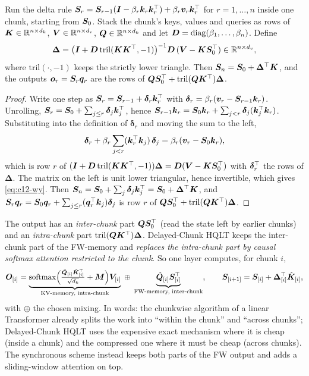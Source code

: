 \begin{proposition}\label{prop:c12-chunk-delta}
Run the delta rule $\bm{S}_r = \bm{S}_{r-1}(\bm{I}-\beta_r\bm{k}_r\bm{k}_r^{\top}) + \beta_r\bm{v}_r\bm{k}_r^{\top}$ for $r =
1,\dots,n$ inside one chunk, starting from $\bm{S}_0$. Stack the chunk's keys, values and queries as
rows of $\bm{K}\in\mathbb{R}^{n\times d_k}$, $\bm{V}\in\mathbb{R}^{n\times d_v}$, $\bm{Q}\in\mathbb{R}^{n\times d_k}$ and let
$\bm{D} = \operatorname{diag}(\beta_1,\dots,\beta_n)$. Define
\begin{equation}\label{eq:c12-wy}
  \bm\Delta = \big(\bm{I} + \bm{D}\,\mathrm{tril}(\bm{K}\bm{K}^{\top},-1)\big)^{-1}\bm{D}\,(\bm{V} - \bm{K}\bm{S}_0^{\top})
  \in\mathbb{R}^{n\times d_v},
\end{equation}
where $\mathrm{tril}(\cdot,-1)$ keeps the strictly lower triangle. Then $\bm{S}_n = \bm{S}_0 +
\bm\Delta^{\top}\bm{K}$, and the outputs $\bm{o}_r = \bm{S}_r\bm{q}_r$ are the rows of $\bm{Q}\bm{S}_0^{\top} +
\mathrm{tril}(\bm{Q}\bm{K}^{\top})\bm\Delta$.
\end{proposition}
\begin{proof}
Write one step as $\bm{S}_r = \bm{S}_{r-1} + \bm\delta_r\bm{k}_r^{\top}$ with $\bm\delta_r =
\beta_r(\bm{v}_r - \bm{S}_{r-1}\bm{k}_r)$. Unrolling, $\bm{S}_r = \bm{S}_0 + \sum_{j\le r}\bm\delta_j\bm{k}_j^{\top}$,
hence $\bm{S}_{r-1}\bm{k}_r = \bm{S}_0\bm{k}_r + \sum_{j<r}\bm\delta_j(\bm{k}_j^{\top}\bm{k}_r)$. Substituting into the
definition of $\bm\delta_r$ and moving the sum to the left,
\[
  \bm\delta_r + \beta_r\sum_{j<r}(\bm{k}_r^{\top}\bm{k}_j)\,\bm\delta_j = \beta_r(\bm{v}_r - \bm{S}_0\bm{k}_r),
\]
which is row $r$ of $(\bm{I} + \bm{D}\,\mathrm{tril}(\bm{K}\bm{K}^{\top},-1))\bm\Delta = \bm{D}(\bm{V} - \bm{K}\bm{S}_0^{\top})$
with $\bm\delta_r^{\top}$ the rows of $\bm\Delta$. The matrix on the left is unit lower triangular,
hence invertible, which gives \eqref{eq:c12-wy}. Then $\bm{S}_n = \bm{S}_0 + \sum_j\bm\delta_j\bm{k}_j^{\top}
= \bm{S}_0 + \bm\Delta^{\top}\bm{K}$, and $\bm{S}_r\bm{q}_r = \bm{S}_0\bm{q}_r + \sum_{j\le r}(\bm{q}_r^{\top}\bm{k}_j)\bm\delta_j$
is row $r$ of $\bm{Q}\bm{S}_0^{\top} + \mathrm{tril}(\bm{Q}\bm{K}^{\top})\bm\Delta$.
\end{proof}

The output has an \emph{inter-chunk} part $\bm{Q}\bm{S}_0^{\top}$ (read the state left by earlier chunks)
and an \emph{intra-chunk} part $\mathrm{tril}(\bm{Q}\bm{K}^{\top})\bm\Delta$. Delayed-Chunk HQLT keeps the
inter-chunk part of the FW-memory and \emph{replaces the intra-chunk part by causal softmax
attention restricted to the chunk}. So one layer computes, for chunk $i$,
\begin{equation}\label{eq:c12-delayed-chunk}
  \bm{O}_{[i]} = \underbrace{\operatorname{softmax}\!\Big(\tfrac{\tilde{\bm{Q}}_{[i]}\tilde{\bm{K}}_{[i]}^{\top}}{\sqrt{d_k}} + \bm{M}\Big)\bm{V}_{[i]}}_{\text{KV-memory, intra-chunk}}
  \;\oplus\; \underbrace{\hat{\bm{Q}}_{[i]}\bm{S}_{[i]}^{\top}}_{\text{FW-memory, inter-chunk}},\qquad
  \bm{S}_{[i+1]} = \bm{S}_{[i]} + \bm\Delta_{[i]}^{\top}\hat{\bm{K}}_{[i]},
\end{equation}
with $\oplus$ the chosen mixing. In words: the chunkwise algorithm of a linear Transformer
already splits the work into ``within the chunk'' and ``across chunks''; Delayed-Chunk HQLT uses
the expensive exact mechanism where it is cheap (inside a chunk) and the compressed one where it
must be cheap (across chunks). The synchronous scheme instead keeps both parts of the FW output
and adds a sliding-window attention on top.

